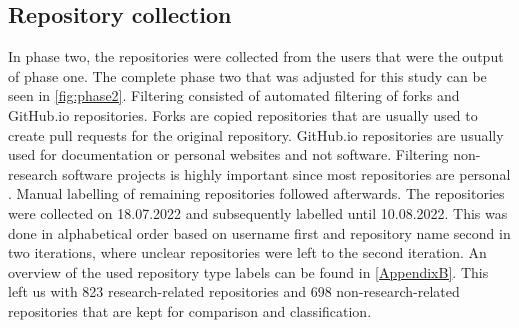 
\newpage
\subsection{Repository collection}

In phase two, the repositories were collected from the users that were the output of phase one. The complete phase two that was adjusted for this study can be seen in \autoref{fig:phase2}. Filtering consisted of automated filtering of forks and GitHub.io repositories. Forks are copied repositories that are usually used to create pull requests for the original repository. GitHub.io repositories are usually used for documentation or personal websites and not software. Filtering non-research software projects is highly important since most repositories are personal \cite{cosentino_systematic_2017, kalliamvakou_promises_2014}. 
Manual labelling of remaining repositories followed afterwards. The repositories were collected on 18.07.2022 and subsequently labelled until 10.08.2022. This was done in alphabetical order based on username first and repository name second in two iterations, where unclear repositories were left to the second iteration. An overview of the used repository type labels can be found in \autoref{AppendixB}. 
This left us with 823 research-related repositories and 698 non-research-related repositories that are kept for comparison and classification. 

